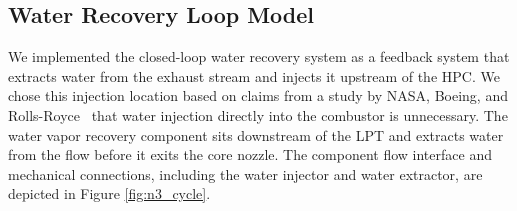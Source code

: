 \documentclass[conf]{new-aiaa}
\begin{document}
\subsection{Water Recovery Loop Model}
We implemented the closed-loop water recovery system as a feedback system that extracts water from the exhaust stream and injects it upstream of the HPC.
We chose this injection location based on claims from a study by NASA, Boeing, and Rolls-Royce~\cite{Daggett2010} that water injection directly into the combustor is unnecessary.
The water vapor recovery component sits downstream of the LPT and extracts water from the flow before it exits the core nozzle.
The component flow interface and mechanical connections, including the water injector and water extractor, are depicted in Figure \ref{fig:n3_cycle}.
\end{document}
